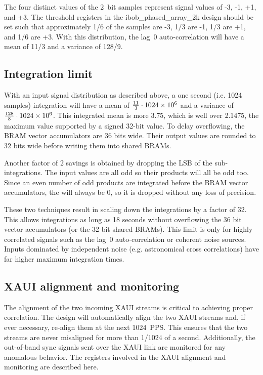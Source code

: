 \documentclass[12pt]{article}
\begin{document}
The four distinct values of the 2~bit samples represent signal values of -3,
-1, +1, and +3.  The threshold registers in the ibob\_phased\_array\_2k design
should be set such that approximately 1/6 of the samples are -3, 1/3 are -1,
1/3 are +1, and 1/6 are +3.  With this distribution, the lag~0 auto-correlation
will have a mean of 11/3 and a variance of 128/9.

\subsection{Integration limit}

With an input signal distribution as described above, a one second (i.e.
1024 samples) integration will have a mean of $\frac{11}{3}\cdot1024\times 10^{6}$ and
a variance of $\frac{128}{8}\cdot1024\times 10^{6}$.  This integrated mean is more
3.75, which is well over 2.1475, the maximum value supported by a signed
32-bit value.  To delay overflowing, the BRAM vector accumulators are 36 bits
wide.  Their output values are rounded to 32 bits wide before writing them into
shared BRAMs.

Another factor of 2 savings is obtained by dropping the LSB of the
sub-integrations.  The input values are all odd so their products will all be
odd too.  Since an even number of odd products are integrated before the BRAM
vector accumulators, the \LSb will always be 0, so it is dropped without any
loss of precision.

These two techniques result in scaling down the integrations by a factor of 32.
This allows integrations as long as 18 seconds without overflowing the 36 bit
vector accumulators (or the 32 bit shared BRAMs).  This limit is only for
highly correlated signals such as the lag~0 auto-correlation or coherent noise
sources.  Inputs dominated by independent noise (e.g. astronomical cross
correlations) have far higher maximum integration times.

\subsection{XAUI alignment and monitoring}

The alignment of the two incoming XAUI streams is critical to achieving proper
correlation.  The design will automatically align the two XAUI streams and, if
ever necessary, re-align them at the next 1024~PPS.  This ensures that the two
streams are never misaligned for more than 1/1024 of a second.  Additionally,
the out-of-band sync signals sent over the XAUI link are monitored for any
anomalous behavior.  The registers involved in the XAUI alignment and
monitoring are described here.
\end{document}
